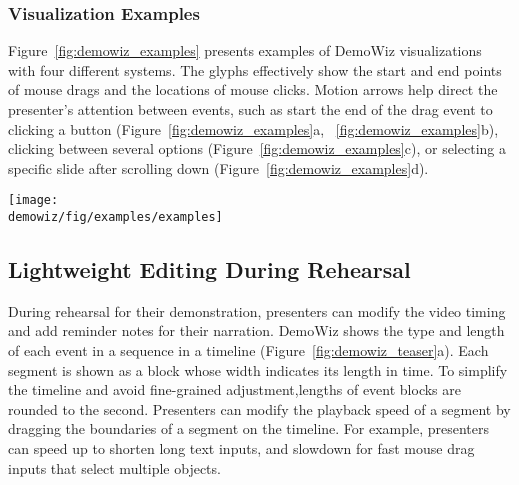 
\subsubsection{Visualization Examples}
Figure~\ref{fig:demowiz_examples} presents examples of DemoWiz visualizations with four different systems. The glyphs effectively show the start and end points of mouse drags and the locations of mouse clicks. Motion arrows help direct the presenter's attention between events, such as start the end of the drag event to clicking a button (Figure~\ref{fig:demowiz_examples}a, ~\ref{fig:demowiz_examples}b), clicking between several options (Figure~\ref{fig:demowiz_examples}c), or selecting a specific slide after scrolling down (Figure~\ref{fig:demowiz_examples}d).

\begin{figure*}[t]
  \centering
  \texttt{[image: \\demowiz/fig/examples/examples]}
  \caption{Examples of DemoWiz visualizations with four different systems and input event sequences.}
  \label{fig:demowiz_examples}
\end{figure*}


\subsection{Lightweight Editing During Rehearsal}
During rehearsal for their demonstration, presenters can modify the video timing and add reminder notes for their narration. DemoWiz shows the type and length of each event in a sequence in a timeline (Figure~\ref{fig:demowiz_teaser}a). Each segment is shown as a block whose width indicates its length in time. To simplify the timeline and avoid fine-grained adjustment,lengths of event blocks are rounded to the second. Presenters can modify the playback speed of a segment by dragging the boundaries of a segment on the timeline. For example, presenters can speed up to shorten long text inputs, and slowdown for fast mouse drag inputs that select multiple objects.


